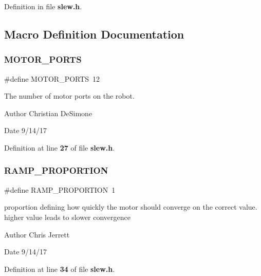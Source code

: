 Definition in file \textbf{ slew.\+h}.



\subsection{Macro Definition Documentation}
\mbox{\label{slew_8h_ad1ad4b29af4180aa00713599367fbc98}} 
\subsubsection{M\+O\+T\+O\+R\+\_\+\+P\+O\+R\+TS}
{\footnotesize\ttfamily \#define M\+O\+T\+O\+R\+\_\+\+P\+O\+R\+TS~12}



The number of motor ports on the robot. 

\begin{DoxyAuthor}{Author}
Christian De\+Simone 
\end{DoxyAuthor}
\begin{DoxyDate}{Date}
9/14/17 
\end{DoxyDate}


Definition at line \textbf{ 27} of file \textbf{ slew.\+h}.

\mbox{\label{slew_8h_a4a3ff8667251227c99f8f4c81e9ff467}} 
\subsubsection{R\+A\+M\+P\+\_\+\+P\+R\+O\+P\+O\+R\+T\+I\+ON}
{\footnotesize\ttfamily \#define R\+A\+M\+P\+\_\+\+P\+R\+O\+P\+O\+R\+T\+I\+ON~1}



proportion defining how quickly the motor should converge on the correct value. higher value leads to slower convergence 

\begin{DoxyAuthor}{Author}
Chris Jerrett 
\end{DoxyAuthor}
\begin{DoxyDate}{Date}
9/14/17 
\end{DoxyDate}


Definition at line \textbf{ 34} of file \textbf{ slew.\+h}.

